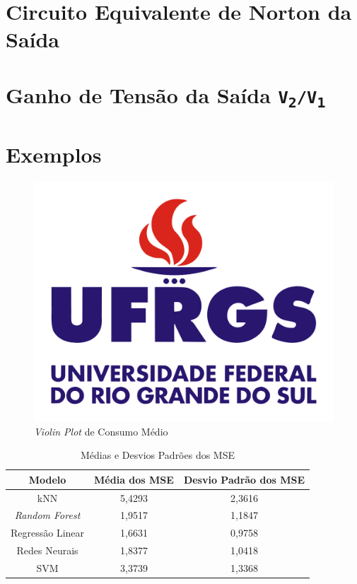 \documentclass{report}
\let\oldsection\section
\renewcommand\section{\clearpage\oldsection}
\begin{document}
\section{Circuito Equivalente de Norton da Saída}

\section{Ganho de Tensão da Saída \texorpdfstring{\texttt{V\textsubscript{2}/V\textsubscript{1}}}{V2/V1}}

\section{Exemplos}

\begin{figure}[h!]
  \centering
  \includegraphics[width=.85\linewidth]{images/logos/UFRGS.png}
  \caption{\label{img:combination_dist} \textit{Violin Plot} de Consumo Médio}
\end{figure}

\begin{table}[h!]
  \centering
  \begin{tabular}{| c | c | c |}
      \hline
      \rowcolor{lightgray}
      \textbf{Modelo} & \textbf{Média dos MSE} & \textbf{Desvio Padrão dos MSE} \\
      \hline
      kNN & 5,4293 & 2,3616 \\
      \hline
      \textit{Random Forest} & 1,9517 & 1,1847 \\
      \hline
      Regressão Linear & 1,6631 & 0,9758 \\
      \hline
      Redes Neurais & 1,8377 & 1,0418 \\
      \hline
      SVM & 3,3739 & 1,3368 \\
      \hline
  \end{tabular}
  \caption{\label{table:model_summary} Médias e Desvios Padrões dos MSE}
\end{table}
\end{document}
